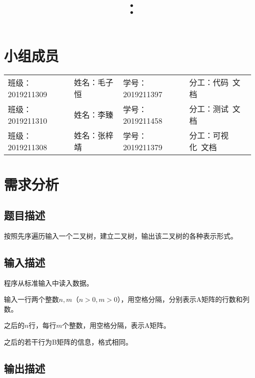 \documentclass{article}
\title{\hmwkClass\ ：\hmwkTitle}
\author{\hmwkAuthorName}
\begin{document}
\maketitle

\section*{小组成员}

\setlength{\tabcolsep}{9mm}
{
    \begin{table}[htbp]
        \centering
        \begin{tabular}{llll}
            班级：2019211309 & 姓名：毛子恒 & 学号：2019211397 & 分工：代码\ 文档   \\

            班级：2019211310 & 姓名：李臻   & 学号：2019211458 & 分工：测试\ 文档   \\

            班级：2019211308 & 姓名：张梓靖 & 学号：2019211379 & 分工：可视化\ 文档 \\
        \end{tabular}
    \end{table}
}

\tableofcontents
\newpage

\section{需求分析}

\subsection{题目描述}

按照先序遍历输入一个二叉树，建立二叉树，输出该二叉树的各种表示形式。

\subsection{输入描述}

程序从标准输入中读入数据。

输入一行两个整数$n,m$（$n>0,m>0$），用空格分隔，分别表示A矩阵的行数和列数。

之后的$n$行，每行$m$个整数，用空格分隔，表示A矩阵。

之后的若干行为B矩阵的信息，格式相同。

\subsection{输出描述}
\end{document}
